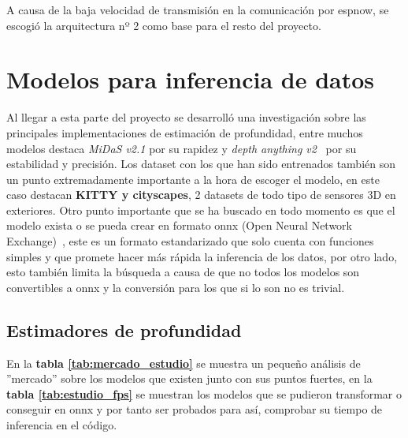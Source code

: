 A causa de la baja velocidad de transmisión en la comunicación por espnow, se escogió la arquitectura nº 2 como base para el resto del proyecto.

    \section{Modelos para inferencia de datos}
Al llegar a esta parte del proyecto se desarrolló una investigación sobre las principales implementaciones de estimación de profundidad, entre muchos modelos destaca \textit{MiDaS v2.1} por su rapidez y \textit{depth anything v2}~\cite{cheng2024depthanything} por su estabilidad y precisión. Los dataset con los que han sido entrenados también son un punto extremadamente importante a la hora de escoger el modelo, en este caso destacan \textbf{KITTY y cityscapes}, 2 datasets de todo tipo de sensores 3D en exteriores.
Otro punto importante que se ha buscado en todo momento es que el modelo exista o se pueda crear en formato onnx (Open Neural Network Exchange)~\cite{onnx_repo}, este es un formato estandarizado que solo cuenta con funciones simples y que promete hacer más rápida la inferencia de los datos, por otro lado, esto también limita la búsqueda a causa de que no todos los modelos son convertibles a onnx y la conversión para los que si lo son no es trivial.

        \subsection{Estimadores de profundidad}
En la \textbf{tabla \ref{tab:mercado_estudio}} se muestra un pequeño análisis de ''mercado'' sobre los modelos que existen junto con sus puntos fuertes, en la \textbf{tabla \ref{tab:estudio_fps}} se muestran los modelos que se pudieron transformar o conseguir en onnx y por tanto ser probados para así, comprobar su tiempo de inferencia en el código.


